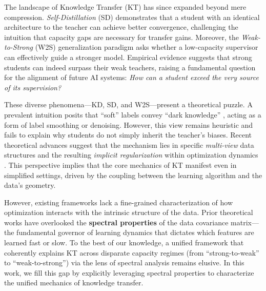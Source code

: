 \documentclass{article}
\theoremstyle{definition}
\theoremstyle{definition}
\theoremstyle{plain}
\theoremstyle{plain}
\theoremstyle{plain}
\theoremstyle{plain}
\theoremstyle{plain}
\begin{document}
The landscape of Knowledge Transfer (KT) has since expanded beyond mere compression. \emph{Self-Distillation} (SD) \citep{furlanello2018bornneuralnetworks} demonstrates that a student with an identical architecture to the teacher can achieve better convergence, challenging the intuition that capacity gaps are necessary for transfer gains. Moreover, the \emph{Weak-to-Strong} (W2S) generalization paradigm \citep{Burns2023WeaktoStrongGE} asks whether a low-capacity supervisor can effectively guide a stronger model. Empirical evidence suggests that strong students can indeed surpass their weak teachers, raising a fundamental question for the alignment of future AI systems: \emph{How can a student exceed the very source of its supervision?} 

These diverse phenomena---KD, SD, and W2S---present a theoretical puzzle. A prevalent intuition posits that ``soft'' labels convey ``dark knowledge'' \citep{hinton2015distillingknowledgeneuralnetwork}, acting as a form of label smoothing or denoising. However, this view remains heuristic and fails to explain why students do not simply inherit the teacher's biases. Recent theoretical advances suggest that the mechanism lies in specific \emph{multi-view} data structures and the resulting \emph{implicit regularization} within optimization dynamics \citep{allenzhu2023understandingensembleknowledgedistillation}. This perspective implies that the core mechanics of KT manifest even in simplified settings, driven by the coupling between the learning algorithm and the data's geometry.

However, existing frameworks lack a fine-grained characterization of how optimization interacts with the intrinsic structure of the data. Prior theoretical works have overlooked the \textbf{spectral properties} of the data covariance matrix—the fundamental governor of learning dynamics that dictates which features are learned fast or slow. To the best of our knowledge, a unified framework that coherently explains KT across disparate capacity regimes (from ``strong-to-weak'' to ``weak-to-strong'') via the lens of spectral analysis remains elusive. In this work, we fill this gap by explicitly leveraging spectral properties to characterize the unified mechanics of knowledge transfer.

\end{document}
